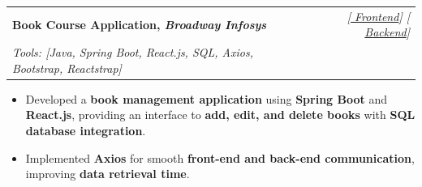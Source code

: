 \documentclass[a4paper,11pt]{article}
\makeatletter
\newcommand{\resumeProject}[4]{
\vspace{0.5mm}\item
    \begin{tabular*}{0.98\textwidth}[t]{l@{\extracolsep{\fill}}r}
        \textbf{#1} & \textit{\footnotesize{#3}} \\
        \footnotesize{\textit{#2}} & \footnotesize{#4}
    \end{tabular*}
    \vspace{-2.4mm}
}
\newcommand{\resumeItemListStart}{\begin{itemize}[leftmargin=*,labelsep=1mm,itemsep=0.5mm]}
\newcommand{\resumeItemListEnd}{\end{itemize}\vspace{-2mm}}
\makeatother
\begin{document}
\resumeProject
  {Book Course Application, \textit{Broadway Infosys}}
  {Tools: [Java, Spring Boot, React.js, SQL, Axios, Bootstrap, Reactstrap]}
  {{}[\href{https://github.com/aayush105/book-course-web}{\textcolor{darkblue}{\faGithub} {Frontend}}] {}[\href{https://github.com/aayush105/book-course-backend}{\textcolor{darkblue}{\faGithub} {Backend}}]}
  {}
\resumeItemListStart
  \item Developed a \textbf{book management application} using \textbf{Spring Boot} and \textbf{React.js}, providing an interface to \textbf{add, edit, and delete books} with \textbf{SQL database integration}.
  \item Implemented \textbf{Axios} for smooth \textbf{front-end and back-end communication}, improving \textbf{data retrieval time}.
\resumeItemListEnd






\end{document}
